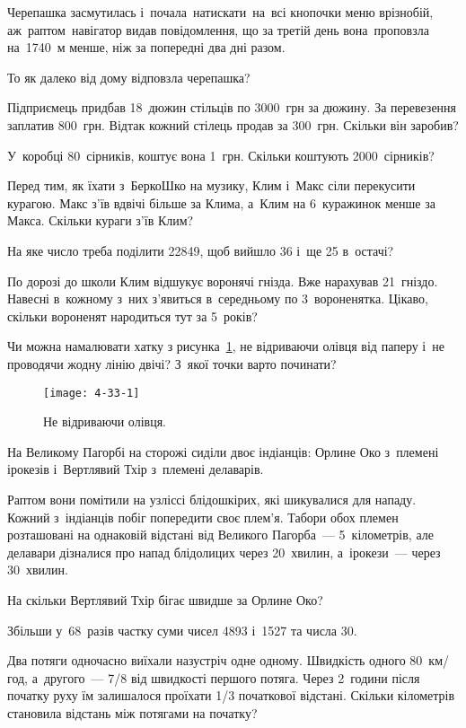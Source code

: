 Черепашка засмутилась і~почала натискати на всі кнопочки меню врізнобій,
аж~раптом навігатор видав повідомлення, що за третій день вона проповзла
на 1740~м менше, ніж за попередні два дні разом.

То як далеко від дому відповзла черепашка?


\problem
Підприємець придбав 18~дюжин стільців по 3000~грн за дюжину.
За перевезення заплатив 800~грн.
Відтак кожний стілець продав за 300~грн.
Скільки він заробив?


\problem
У~коробці 80~сірників, коштує вона 1~грн.
Скільки коштують 2000~сірників?


\problem
Перед тим, як їхати з~БеркоШко на музику, Клим і~Макс сіли перекусити курагою.
Макс з’їв вдвічі більше за Клима, а~Клим на 6~куражинок менше за Макса.
Скільки кураги з’їв Клим?


\problem
На яке число треба поділити 22849, щоб вийшло 36 і~ще 25 в~остачі?


\problem
По дорозі до школи Клим відшукує воронячі гнізда. Вже нарахував 21~гніздо.
Навесні в~кожному з~них з’явиться в~середньому по 3~вороненятка.
Цікаво, скільки вороненят народиться тут за 5~років?


\problem
Чи можна намалювати хатку з рисунка~\ref{fig:one-line-figure},
не відриваючи олівця від паперу і~не проводячи жодну лінію двічі?
З~якої точки варто починати?

\begin{figure}[ht]
  \centering
  \texttt{[image: 4-33-1]}
  \caption{Не відриваючи олівця.}
  \label{fig:one-line-figure}
\end{figure}


\problem
На Великому Пагорбі на сторожі сиділи двоє індіанців:
Орлине Око з~племені ірокезів і~Вертлявий Тхір з~племені делаварів.

Раптом вони помітили на узліссі блідошкірих, які шикувалися для нападу.
Кожний з~індіанців побіг попередити своє плем’я.
Табори обох племен розташовані на однаковій відстані від Великого Пагорба~---
5~кілометрів, але делавари дізналися про напад блідолицих через 20~хвилин,
а~ірокези~--- через 30~хвилин.

На скільки Вертлявий Тхір бігає швидше за Орлине Око?


\problem
Збільши у~68~разів частку суми чисел 4893 і~1527 та числа 30.


\problem
Два потяги одночасно виїхали назустріч одне одному.
Швидкість одного 80~км/год, а~другого~--- 7/8 від швидкості першого потяга.
Через 2~години після початку руху їм залишалося проїхати
1/3 початкової відстані.
Скільки кілометрів становила відстань між потягами на початку?


